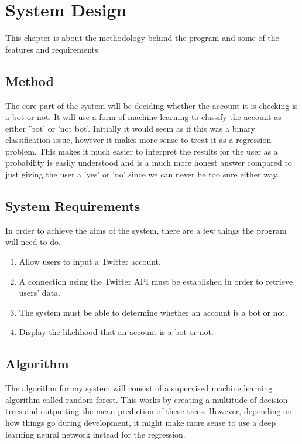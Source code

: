 
\chapter{System Design}

\label{Chapter3}
This chapter is about the methodology behind the program and some of the features and requirements.

\section{Method}
The core part of the system will be deciding whether the account it is checking is a bot or not. It will use a form of machine learning to classify the account as either 'bot' or 'not bot'. Initially it would seem as if this was a binary classification issue, however it makes more sense to treat it as a regression problem. This makes it much easier to interpret the results for the user as a probability is easily understood and is a much more honest answer compared to just giving the user a 'yes' or 'no' since we can never be too sure either way.


\section{System Requirements}
In order to achieve the aims of the system, there are a few things the program will need to do.
\begin{enumerate}
	\item Allow users to input a Twitter account.
	\item A connection using the Twitter API must be established in order to retrieve users' data.
	\item The system must be able to determine whether an account is a bot or not.
	\item Display the likelihood that an account is a bot or not.
\end{enumerate}

\section{Algorithm}
The algorithm for my system will consist of a supervised machine learning algorithm called random forest. This works by creating a multitude of decision trees and outputting the mean prediction of these trees. However, depending on how things go during development, it might make more sense to use a deep learning neural network instead for the regression. 

